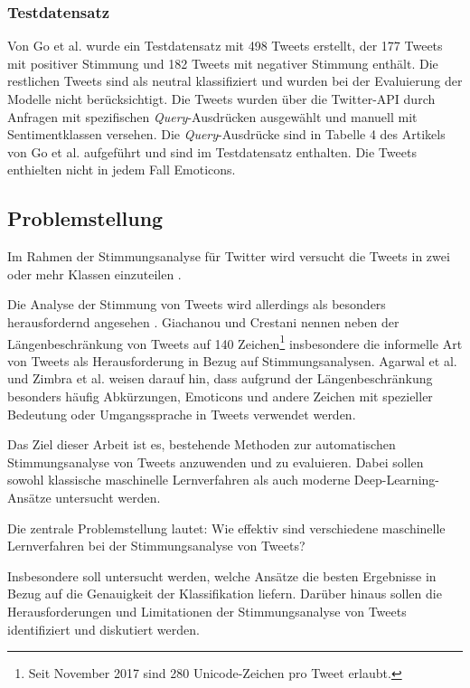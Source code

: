 \subsubsection{Testdatensatz}

Von Go et al. \cite{go2009twitter} wurde ein Testdatensatz mit 498 Tweets erstellt, der 177 Tweets mit positiver Stimmung und 182 Tweets mit negativer Stimmung enthält.
Die restlichen Tweets sind als neutral klassifiziert und wurden bei der Evaluierung der Modelle nicht berücksichtigt.
Die Tweets wurden über die Twitter-API durch Anfragen mit spezifischen \textit{Query}-Ausdrücken ausgewählt und manuell mit Sentimentklassen versehen.
Die \textit{Query}-Ausdrücke sind in Tabelle 4 des Artikels von Go et al. \cite[S. 5]{go2009twitter} aufgeführt und sind im Testdatensatz enthalten.
Die Tweets enthielten nicht in jedem Fall Emoticons.

\subsection{Problemstellung}



Im Rahmen der Stimmungsanalyse für Twitter wird versucht die Tweets in zwei oder mehr Klassen einzuteilen \cite{zimbra2018state}.

Die Analyse der Stimmung von Tweets wird allerdings als besonders herausfordernd angesehen \cite{agarwal2011sentiment, giachanou2016like, zimbra2018state}.
Giachanou und Crestani \cite{giachanou2016like} nennen neben der Längenbeschränkung von Tweets auf 140 Zeichen\footnote{
    Seit November 2017 sind 280 Unicode-Zeichen pro Tweet erlaubt.
} insbesondere die informelle Art von Tweets als Herausforderung in Bezug auf Stimmungsanalysen.
Agarwal et al. \cite{agarwal2011sentiment} und Zimbra et al. \cite{zimbra2018state} weisen darauf hin, dass aufgrund der Längenbeschränkung besonders häufig Abkürzungen, Emoticons und andere Zeichen mit spezieller Bedeutung oder Umgangssprache in Tweets verwendet werden.
\newline

Das Ziel dieser Arbeit ist es, bestehende Methoden zur automatischen Stimmungsanalyse von Tweets anzuwenden und zu evaluieren.
Dabei sollen sowohl klassische maschinelle Lernverfahren als auch moderne Deep-Learning-Ansätze untersucht werden.

Die zentrale Problemstellung lautet: Wie effektiv sind verschiedene maschinelle Lernverfahren bei der Stimmungsanalyse von Tweets?

Insbesondere soll untersucht werden, welche Ansätze die besten Ergebnisse in Bezug auf die Genauigkeit der Klassifikation liefern.
Darüber hinaus sollen die Herausforderungen und Limitationen der Stimmungsanalyse von Tweets identifiziert und diskutiert werden.
